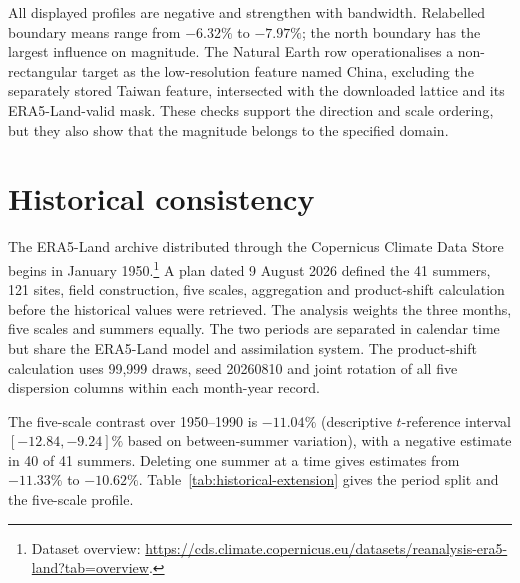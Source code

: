 \documentclass[namedate,webpdf,modern,mediumone]{oup-authoring-template}
\theoremstyle{thmstyleone}
\begin{document}
All displayed profiles are negative and strengthen with bandwidth. Relabelled
boundary means range from $-6.32\%$ to $-7.97\%$; the north boundary has the
largest influence on magnitude. The Natural Earth row operationalises a
non-rectangular target as the low-resolution feature named China, excluding
the separately stored Taiwan feature, intersected with the downloaded lattice
and its ERA5-Land-valid mask. These checks support the direction and scale
ordering, but they also show that the magnitude belongs to the specified
domain.

\section{Historical consistency}
\label{sec:historical-extension}

The ERA5-Land archive distributed through the Copernicus Climate Data Store
begins in January 1950.\footnote{Dataset overview:
\url{https://cds.climate.copernicus.eu/datasets/reanalysis-era5-land?tab=overview}.}
A plan dated 9 August 2026 defined the 41 summers, 121 sites, field
construction, five scales, aggregation and product-shift calculation before
the historical values were retrieved. The analysis weights the three months,
five scales and summers equally. The two periods are separated in calendar
time but share the ERA5-Land model and assimilation system. The product-shift
calculation uses 99,999 draws, seed 20260810 and joint rotation of all five
dispersion columns within each month-year record.

The five-scale contrast over 1950--1990 is $-11.04\%$ (descriptive
$t$-reference interval $[-12.84,-9.24]\%$ based on between-summer variation),
with a negative estimate in 40 of 41
summers. Deleting one summer at a time gives estimates from $-11.33\%$ to
$-10.62\%$. Table~\ref{tab:historical-extension} gives the period split
and the five-scale profile.
\end{document}
